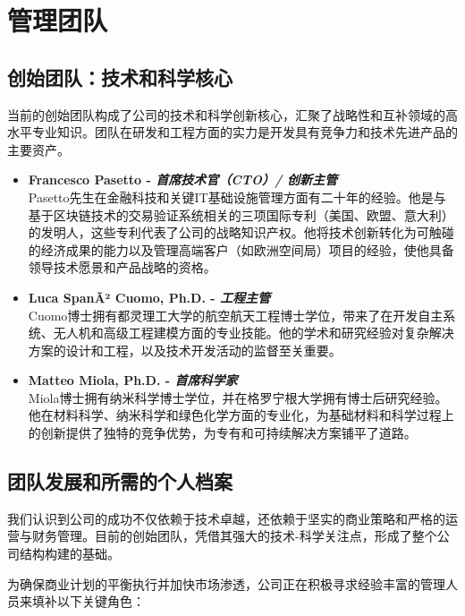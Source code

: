 \documentclass[11pt, a4paper, oneside]{article}
\begin{document}
\section{管理团队}

\subsection{创始团队：技术和科学核心}

当前的创始团队构成了公司的技术和科学创新核心，汇聚了战略性和互补领域的高水平专业知识。团队在研发和工程方面的实力是开发具有竞争力和技术先进产品的主要资产。

\begin{itemize}
    \item \textbf{Francesco Pasetto - \textit{首席技术官（CTO）/ 创新主管}} \\
    Pasetto先生在金融科技和关键IT基础设施管理方面有二十年的经验。他是与基于区块链技术的交易验证系统相关的三项国际专利（美国、欧盟、意大利）的发明人，这些专利代表了公司的战略知识产权。他将技术创新转化为可触碰的经济成果的能力以及管理高端客户（如欧洲空间局）项目的经验，使他具备领导技术愿景和产品战略的资格。

    \item \textbf{Luca SpanÃ² Cuomo, Ph.D. - \textit{工程主管}} \\
    Cuomo博士拥有都灵理工大学的航空航天工程博士学位，带来了在开发自主系统、无人机和高级工程建模方面的专业技能。他的学术和研究经验对复杂解决方案的设计和工程，以及技术开发活动的监督至关重要。

    \item \textbf{Matteo Miola, Ph.D. - \textit{首席科学家}} \\
    Miola博士拥有纳米科学博士学位，并在格罗宁根大学拥有博士后研究经验。他在材料科学、纳米科学和绿色化学方面的专业化，为基础材料和科学过程上的创新提供了独特的竞争优势，为专有和可持续解决方案铺平了道路。
\end{itemize}

\subsection{团队发展和所需的个人档案}

我们认识到公司的成功不仅依赖于技术卓越，还依赖于坚实的商业策略和严格的运营与财务管理。目前的创始团队，凭借其强大的技术-科学关注点，形成了整个公司结构构建的基础。

为确保商业计划的平衡执行并加快市场渗透，公司正在积极寻求经验丰富的管理人员来填补以下关键角色：
\end{document}
